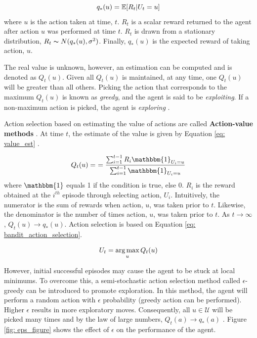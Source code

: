 \begin{equation}
    \centering
    q_*(u) = \mathbb{E}[R_t | U_t = u]
    \label{eq:01value}
\end{equation}
where $u$ is the action taken at time, $t$.  $R_t$ is a scalar reward returned to the agent after action $u$ was performed at time $t$. $R_t$ is drawn from a stationary distribution, $R_t \thicksim N(q_*(u), \sigma^2)$. Finally, $q_*(u)$ is the expected reward of taking action, $u$.

The real value is unknown, however, an estimation can be computed and is denoted as $Q_t(u)$.  Given all $Q_t(u)$ is maintained, at any time, one $Q_t(u)$ will be greater than all others. Picking the action that corresponds to the maximum $Q_t(u)$ is known as \textit{greedy}, and the agent is said to be \textit{exploiting}.  If a non-maximum action is picked, the agent is \textit{exploring} \cite{sutton}.

Action selection based on estimating the value of actions are called \textbf{Action-value methods} \cite{action_value_method}. At time $t$, the estimate of the value is given by Equation \ref{eq: value_est} \cite{sutton}.

\begin{equation}
    \centering
    Q_t(u) = \
    = \frac{\sum_{i=1}^{t - 1} R_i \mathbbm{1}_{U_i=u}}
    {\sum_{i = 1}^{t - 1} \mathbbm{1}_{U_i = u}}
    \label{eq: value_est}
\end{equation}
where $\mathbbm{1}$ equals 1 if the condition is true, else 0.  $R_i$ is the reward obtained at the $i^{th}$ episode through selecting action, $U_i$.  Intuitively, the numerator is the sum of rewards when action, $u$, was taken prior to $t$.  Likewise, the denominator is the number of times action, $u$, was taken prior to $t$. As $t \rightarrow \infty$, $Q_t(u) \rightarrow q_*(u)$.  Action selection is based on Equation \ref{eq: bandit_action_selection}.

\begin{equation}
    \centering
    U_t = \argmax_u Q_t(u)
    \label{eq: bandit_action_selection}
\end{equation}

However, initial successful episodes may cause the agent to be stuck at local minimums. To overcome this, a semi-stochastic action selection method called $\epsilon$-greedy can be introduced to promote exploration. In this method, the agent will perform a random action with $\epsilon$ probability (greedy action can be performed).  Higher $\epsilon$ results in more exploratory moves.  Consequently, all $u \in \mathcal{U}$ will be picked many times and by the law of large numbers, $Q_t(a) \rightarrow q_*(a)$ \cite{large_numbers}. Figure \ref{fig: eps_figure} shows the effect of $\epsilon$ on the performance of the agent.

